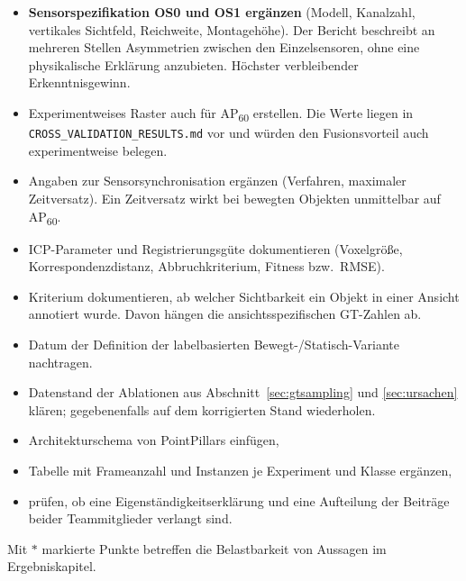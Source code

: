 \begin{itemize}
    \item[\(\ast\)] \textbf{Sensorspezifikation OS0 und OS1 ergänzen} (Modell, Kanalzahl,
          vertikales Sichtfeld, Reichweite, Montagehöhe). Der Bericht beschreibt an
          mehreren Stellen Asymmetrien zwischen den Einzelsensoren, ohne eine
          physikalische Erklärung anzubieten. Höchster verbleibender Erkenntnisgewinn.
    \item Experimentweises Raster auch für AP\textsubscript{60} erstellen. Die Werte liegen
          in \texttt{CROSS\_VALIDATION\_RESULTS.md} vor und würden den Fusionsvorteil
          auch experimentweise belegen.
    \item Angaben zur Sensorsynchronisation ergänzen (Verfahren, maximaler Zeitversatz).
          Ein Zeitversatz wirkt bei bewegten Objekten unmittelbar auf AP\textsubscript{60}.
    \item ICP-Parameter und Registrierungsgüte dokumentieren (Voxelgröße,
          Korrespondenzdistanz, Abbruchkriterium, Fitness bzw.\ RMSE).
    \item Kriterium dokumentieren, ab welcher Sichtbarkeit ein Objekt in einer Ansicht
          annotiert wurde. Davon hängen die ansichtsspezifischen GT-Zahlen ab.
    \item Datum der Definition der labelbasierten Bewegt-\slash Statisch-Variante nachtragen.
    \item Datenstand der Ablationen aus Abschnitt~\ref{sec:gtsampling} und
          \ref{sec:ursachen} klären; gegebenenfalls auf dem korrigierten Stand wiederholen.
    \item Architekturschema von PointPillars einfügen,
    \item Tabelle mit Frameanzahl und Instanzen je Experiment und Klasse ergänzen,
    \item prüfen, ob eine Eigenständigkeitserklärung und eine Aufteilung der
          Beiträge beider Teammitglieder verlangt sind.
\end{itemize}

\noindent Mit \(\ast\) markierte Punkte betreffen die Belastbarkeit von Aussagen im Ergebniskapitel.
